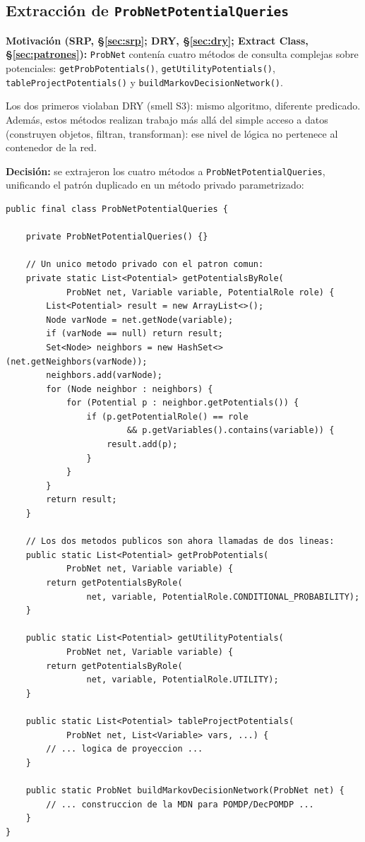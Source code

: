 \documentclass[11pt,a4paper]{article}
\newcommand{\code}[1]{\texttt{#1}}
\begin{document}
\subsection{Extracción de \texttt{ProbNetPotentialQueries}}
\label{sec:potqueries}

\textbf{Motivación (SRP, §\ref{sec:srp}; DRY, §\ref{sec:dry};
Extract Class, §\ref{sec:patrones}):}
\code{ProbNet} contenía cuatro métodos de consulta complejas sobre
potenciales: \code{getProbPotentials()}, \code{getUtilityPotentials()},
\code{tableProjectPotentials()} y \code{buildMarkovDecisionNetwork()}.

Los dos primeros violaban DRY (smell S3): mismo algoritmo, diferente
predicado.  Además, estos métodos realizan trabajo más allá del simple
acceso a datos (construyen objetos, filtran, transforman): ese nivel de
lógica no pertenece al contenedor de la red.

\textbf{Decisión:} se extrajeron los cuatro métodos a
\code{ProbNetPotentialQueries}, unificando el patrón duplicado en un
método privado parametrizado:

\begin{lstlisting}[caption={Unificación del patrón duplicado en
                            \texttt{ProbNetPotentialQueries}.},
                   label=lst:potqueries]
public final class ProbNetPotentialQueries {

    private ProbNetPotentialQueries() {}

    // Un unico metodo privado con el patron comun:
    private static List<Potential> getPotentialsByRole(
            ProbNet net, Variable variable, PotentialRole role) {
        List<Potential> result = new ArrayList<>();
        Node varNode = net.getNode(variable);
        if (varNode == null) return result;
        Set<Node> neighbors = new HashSet<>(net.getNeighbors(varNode));
        neighbors.add(varNode);
        for (Node neighbor : neighbors) {
            for (Potential p : neighbor.getPotentials()) {
                if (p.getPotentialRole() == role
                        && p.getVariables().contains(variable)) {
                    result.add(p);
                }
            }
        }
        return result;
    }

    // Los dos metodos publicos son ahora llamadas de dos lineas:
    public static List<Potential> getProbPotentials(
            ProbNet net, Variable variable) {
        return getPotentialsByRole(
                net, variable, PotentialRole.CONDITIONAL_PROBABILITY);
    }

    public static List<Potential> getUtilityPotentials(
            ProbNet net, Variable variable) {
        return getPotentialsByRole(
                net, variable, PotentialRole.UTILITY);
    }

    public static List<Potential> tableProjectPotentials(
            ProbNet net, List<Variable> vars, ...) {
        // ... logica de proyeccion ...
    }

    public static ProbNet buildMarkovDecisionNetwork(ProbNet net) {
        // ... construccion de la MDN para POMDP/DecPOMDP ...
    }
}
\end{lstlisting}
\end{document}
